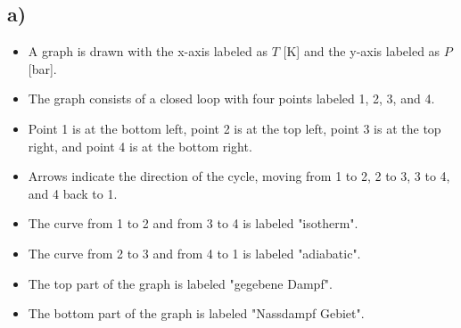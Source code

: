 

\subsection*{a)}

\begin{itemize}
    \item A graph is drawn with the x-axis labeled as $T$ [K] and the y-axis labeled as $P$ [bar].
    \item The graph consists of a closed loop with four points labeled 1, 2, 3, and 4.
    \item Point 1 is at the bottom left, point 2 is at the top left, point 3 is at the top right, and point 4 is at the bottom right.
    \item Arrows indicate the direction of the cycle, moving from 1 to 2, 2 to 3, 3 to 4, and 4 back to 1.
    \item The curve from 1 to 2 and from 3 to 4 is labeled "isotherm".
    \item The curve from 2 to 3 and from 4 to 1 is labeled "adiabatic".
    \item The top part of the graph is labeled "gegebene Dampf".
    \item The bottom part of the graph is labeled "Nassdampf Gebiet".
\end{itemize}